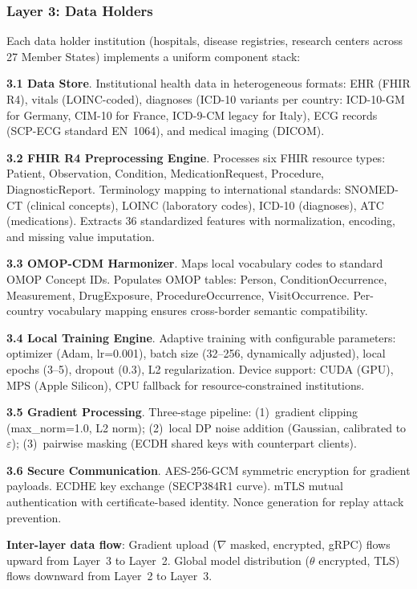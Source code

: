 \documentclass[conference]{IEEEtran}
\begin{document}
\subsubsection{Layer 3: Data Holders}

Each data holder institution (hospitals, disease registries, research centers across 27 Member States) implements a uniform component stack:

\textbf{3.1 Data Store}. Institutional health data in heterogeneous formats: EHR (FHIR R4), vitals (LOINC-coded), diagnoses (ICD-10 variants per country: ICD-10-GM for Germany, CIM-10 for France, ICD-9-CM legacy for Italy), ECG records (SCP-ECG standard EN~1064), and medical imaging (DICOM).

\textbf{3.2 FHIR R4 Preprocessing Engine}. Processes six FHIR resource types: Patient, Observation, Condition, MedicationRequest, Procedure, DiagnosticReport. Terminology mapping to international standards: SNOMED-CT (clinical concepts), LOINC (laboratory codes), ICD-10 (diagnoses), ATC (medications). Extracts 36 standardized features with normalization, encoding, and missing value imputation.

\textbf{3.3 OMOP-CDM Harmonizer}. Maps local vocabulary codes to standard OMOP Concept IDs. Populates OMOP tables: Person, ConditionOccurrence, Measurement, DrugExposure, ProcedureOccurrence, VisitOccurrence. Per-country vocabulary mapping ensures cross-border semantic compatibility.

\textbf{3.4 Local Training Engine}. Adaptive training with configurable parameters: optimizer (Adam, lr=0.001), batch size (32--256, dynamically adjusted), local epochs (3--5), dropout (0.3), L2 regularization. Device support: CUDA (GPU), MPS (Apple Silicon), CPU fallback for resource-constrained institutions.

\textbf{3.5 Gradient Processing}. Three-stage pipeline: (1)~gradient clipping (max\_norm=1.0, L2 norm); (2)~local DP noise addition (Gaussian, calibrated to $\varepsilon$); (3)~pairwise masking (ECDH shared keys with counterpart clients).

\textbf{3.6 Secure Communication}. AES-256-GCM symmetric encryption for gradient payloads. ECDHE key exchange (SECP384R1 curve). mTLS mutual authentication with certificate-based identity. Nonce generation for replay attack prevention.

\textbf{Inter-layer data flow}: Gradient upload ($\nabla$ masked, encrypted, gRPC) flows upward from Layer~3 to Layer~2. Global model distribution ($\theta$ encrypted, TLS) flows downward from Layer~2 to Layer~3.
\end{document}
